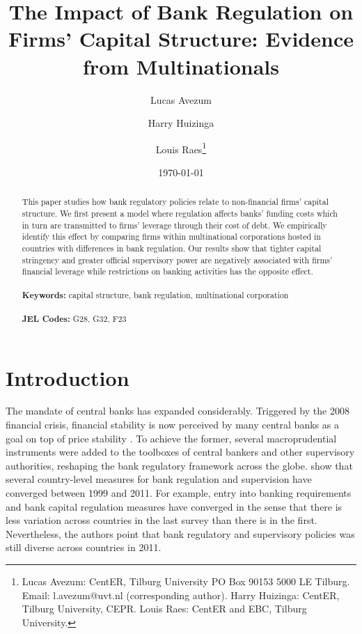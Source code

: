 \documentclass[12pt]{article}
\begin{document}
	
	\begin{titlepage}
		\title{The Impact of Bank Regulation on  Firms' Capital Structure: Evidence from Multinationals}
		
		\author{Lucas Avezum \and Harry Huizinga \and Louis Raes\thanks{Lucas Avezum: CentER, Tilburg University PO Box 90153 5000 LE Tilburg. Email:
				l.avezum@uvt.nl (corresponding author). Harry Huizinga: CentER, Tilburg University, CEPR. Louis Raes: CentER and EBC, Tilburg University.}}
		\date{\today}
		\maketitle
		\begin{abstract}
			\noindent This paper studies how bank regulatory policies relate to non-financial firms' capital structure. We first present a model where regulation affects banks' funding costs which in turn are transmitted to firms' leverage through their cost of debt. We empirically identify this effect by comparing firms within multinational corporations hosted in countries with differences in bank regulation. Our results show that tighter capital stringency and greater official supervisory power are negatively associated with firms' financial leverage while restrictions on banking activities has the opposite effect.  \\
			\vspace{0in}\\
			\noindent\textbf{Keywords:} capital structure, bank regulation, multinational corporation\\
			\vspace{0in}\\
			\noindent\textbf{JEL Codes:} G28, G32, F23 \\
			
			\bigskip
		\end{abstract}
		\setcounter{page}{0}
		\thispagestyle{empty}
	\end{titlepage}
	\pagebreak \newpage
	
	
	\normalem
	
	\doublespacing
	
	
	\section{Introduction} \label{sec:introduction}
	The mandate of central banks has expanded considerably. Triggered by the 2008 financial crisis, financial stability is now perceived by many central banks as a goal on top of price stability \citep*{blinder2017necessity}. To achieve the former, several macroprudential instruments were added to the toolboxes of central bankers and other supervisory authorities, reshaping the bank regulatory framework across the globe. \cite*{barth2013bank} show that several country-level measures for bank regulation and supervision have converged between 1999 and 2011. For example, entry into banking requirements and bank capital regulation measures have converged in the sense that there is less variation across countries in the last survey than there is in the first. Nevertheless, the authors point that bank regulatory and supervisory policies was still diverse across countries in 2011. 
	
\end{document}
